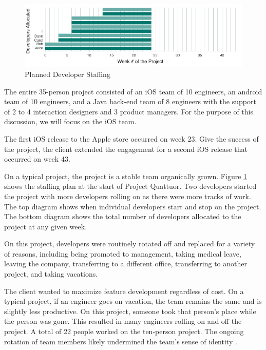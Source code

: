 \begin{figure}[t]
\centering
\includegraphics[width=7.1in]{OriginalDeveloperStaffingV2.jpg}
\caption{Planned Developer Staffing}
\label{PlannedDeveloperStaffing}
\end{figure}

The entire 35-person project consisted of an iOS team of 10 engineers, an android team of 10 engineers, and a Java back-end team of 8 engineers with the support of 2 to 4 interaction designers and 3 product managers. For the purpose of this discussion, we will focus on the iOS team. 

The first iOS release to the Apple store occurred on week 23. Give the success of the project, the client extended the engagement for a second iOS release that occurred on week 43. 

On a typical project, the project is a stable team organically grown. Figure \ref{PlannedDeveloperStaffing} shows the staffing plan at the start of Project Quattuor. Two developers started the project with more developers rolling on as there were more tracks of work. The top diagram shows when individual developers start and stop on the project. The bottom diagram shows the total number of developers allocated to the project at any given week. 

On this project, developers were routinely rotated off and replaced for a variety of reasons, including being promoted to management, taking medical leave, leaving the company, transferring to a different office, transferring to another project, and taking vacations. 

The client wanted to maximize feature development regardless of cost. On a typical project, if an engineer goes on vacation, the team remains the same and is slightly less productive. On this project, someone took that person's place while the person was gone. This resulted in many engineers rolling on and off the project. A total of 22 people worked on the ten-person project. The ongoing rotation of team members likely undermined the team's sense of identity \cite{TuckmanModel}.

